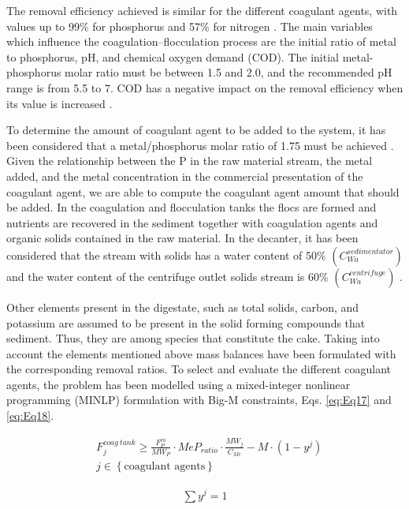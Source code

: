 \begin{refsection}[referencesCh2]
The removal efficiency achieved is similar for the different coagulant agents, with values up to 99\% for phosphorus and 57\% for nitrogen \citep{aguilar2002nutrient}. The main variables which influence the coagulation–flocculation process are the initial ratio of metal to phosphorus, pH, and chemical oxygen demand (COD). The initial metal-phosphorus molar ratio must be between 1.5 and 2.0, and the recommended pH range is from 5.5 to 7. COD has a negative impact on the removal efficiency when its value is increased \citep{szabo2008significance}.

To determine the amount of coagulant agent to be added to the system, it has been considered that a metal/phosphorus molar ratio of 1.75 must be achieved \citep{szabo2008significance}. Given the relationship between the P in the raw material stream, the metal added, and the metal concentration in the commercial presentation of the coagulant agent, we are able to compute the coagulant agent amount that should be added. In the coagulation and flocculation tanks the flocs are formed and nutrients are recovered in the sediment together with coagulation agents and organic solids contained in the raw material. In the decanter, it has been considered that the stream with solids has a water content of 50\% $\left(C^{sedimentator}_{Wa}\right)$ \citep{williams2011digestates} and the water content of the centrifuge outlet solids stream is 60\% $\left(C^{centrifuge}_{Wa}\right)$ \citep{wakeman2007separation}.

Other elements present in the digestate, such as total solids, carbon, and potassium are assumed to be present in the solid forming compounds that sediment. Thus, they are among species that constitute the cake. Taking into account the elements mentioned above mass balances have been formulated with the corresponding removal ratios. To select and evaluate the different coagulant agents, the problem has been modelled using a mixed-integer nonlinear programming (MINLP) formulation with Big-M constraints, Eqs. \ref{eq:Eq17} and \ref{eq:Eq18}.

\begin{align}
	& F_j^{{{coag \ tank}}} \ge \frac{F_P^{in}}{MW_P} \cdot MeP_{ratio} \cdot \frac{MW_j}{C_{Me}} - M \cdot \left(1 - {y^j}\right) \label{eq:Eq17} \\
	& {j} \in \left\{ \text{coagulant agents} \right\} \nonumber
\end{align}

\begin{align}
	\sum {{{{y}}^j}} = 1 \label{eq:Eq18}
\end{align}


\end{refsection}
